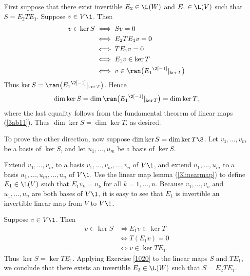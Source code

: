 \begin{Solution}
First suppose that there exist invertible $E_2 \in \L(W)$ and $E_1 \in \L(V)$ such that $S = E_2 T E_1$. Suppose $v \in V\1$. Then
\begin{align*}
v \in \ker S &\iff S v = 0\\
&\iff E_2TE_1v = 0 \\
&\iff TE_1v = 0\\
&\iff E_1v \in \ker T\\
&\iff v \in \ran \bigl( {E_1}^{\2[-1]}|_{\ker T} \bigr)
\end{align*}
Thus $\ker S = \ran \bigl( {E_1}^{\2[-1]}|_{\ker T} \bigr)$. Hence
\[
\dim \ker S = \dim \ran \bigl( {E_1}^{\2[-1]}|_{\ker T} \bigr) = \dim \ker T,
\]
where the last equality follows from the fundamental theorem of linear maps (\ref{3ab11}). Thus
$\dim \ker S = \dim \ker T$, as desired.

To prove the other direction, now suppose $\dim \ker S = \dim \ker T\3$. Let $v_1, \dots, v_m$ be a basis of $\ker S$, and let $u_1, \dots, u_m$ be a basis of $\ker S$.

Extend $v_1, \dots, v_m$ to a basis $v_1, \dots, v_m, \dots, v_n$ of $V\1$, and extend
$u_1, \dots, u_m$ to a basis $u_1, \dots, u_m, \dots, u_n$ of $V\1$. Use the linear map lemma (\ref{3linearmap}) to define $E_1 \in \L(V)$ such  that $E_1v_k = u_k$ for all $k = 1, \dots, n$. Because $v_1, \dots, v_n$ and $u_1, \dots, u_n$ are both bases of $V\1$, it is easy to see that $E_1$ is invertible an invertible linear map from $V$ to $V\1$.

Suppose $v \in V\1$. Then
\begin{align*}
v \in \ker S &\iff E_1v \in \ker T \\
&\iff T(E_1v) = 0 \\
&\iff v \in \ker TE_1.
\end{align*}
Thus $\ker S = \ker T E_1$. Applying Exercise \ref{1020} to the linear maps $S$ and $T E_1$, we conclude that there exists an invertible $E_2 \in \L(W)$ such that $S = E_2 T E_1$.
\end{Solution}

